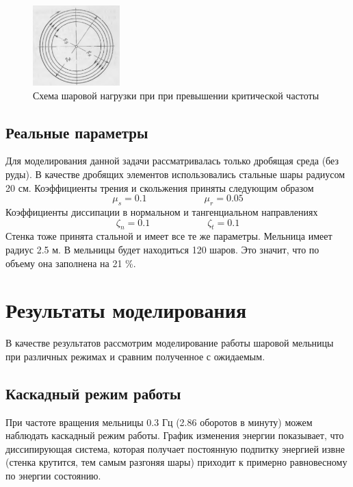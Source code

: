 \documentclass[a4paper]{article}
\begin{document}
\begin{figure}[H]
	\centering
	\includegraphics[width=0.3\textwidth]{kritic_theory} 
	\caption{Схема шаровой нагрузки при при превышении критической частоты}
	\label{pic:kritic_theory}
\end{figure} 

\subsection{Реальные параметры}

Для моделирования данной задачи рассматривалась только дробящая среда (без руды). 
В качестве дробящих элементов использовались стальные шары радиусом 20 см.
Коэффициенты трения и скольжения приняты следующим образом
\[
\mu_s = 0.1 \qquad \qquad \qquad \mu_r = 0.05
\]
Коэффициенты диссипации в нормальном и тангенциальном направлениях
\[
\zeta_n = 0.1 \qquad \qquad \qquad \zeta_t = 0.1
\]
Стенка тоже принята стальной и имеет все те же параметры.
Мельница имеет радиус 2.5 м.
В мельницы будет находиться 120 шаров.
Это значит, что по объему она заполнена на 21 \%.
\newpage

\section{Результаты моделирования}

В качестве результатов рассмотрим моделирование работы шаровой мельницы при различных режимах и сравним полученное с ожидаемым.

\subsection{Каскадный режим работы}

При частоте вращения мельницы 0.3 Гц (2.86 оборотов в минуту) можем наблюдать каскадный режим работы.
График изменения энергии показывает, что диссипирующая система, которая получает постоянную подпитку энергией извне (стенка крутится, тем самым разгоняя шары) приходит к примерно равновесному по энергии состоянию.
\end{document}

